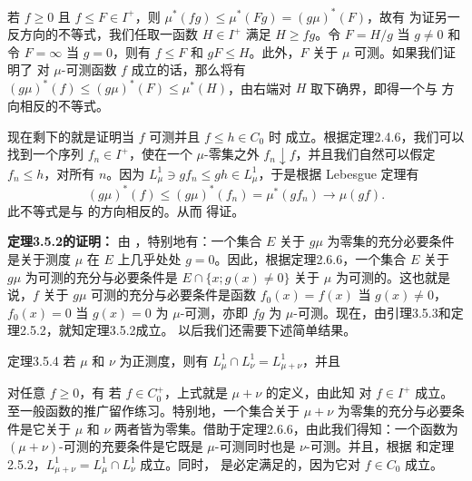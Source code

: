 若 $f\ge0$ 且 $f\le F\in I^+$，则 $\mu^*(fg)\le\mu^*(Fg)=(g\mu)^*(F)$，故有
为证另一反方向的不等式，我们任取一函数 $H\in I^+$ 满足 $H\ge fg$。令 $F=H/g$ 当 $g\ne0$ 和令 $F=\infty$ 当 $g=0$，则有 $f\le F$ 和 $gF\le H$。此外，$F$ 关于 $\mu$ 可测。如果我们证明了  对 $\mu$-可测函数 $f$ 成立的话，那么将有 $(g\mu)^*(f)\le(g\mu)^*(F)\le\mu^*(H)$，由右端对 $H$ 取下确界，即得一个与  方向相反的不等式。

现在剩下的就是证明当 $f$ 可测并且 $f\le h\in C_0$ 时  成立。根据定理2.4.6，我们可以找到一个序列 $f_n\in I^+$，使在一个 $\mu$-零集之外 $f_n\downarrow f$，并且我们自然可以假定 $f_n\le h$，对所有 $n$。因为 $L^1_\mu\ni gf_n\le gh\in L^1_\mu$，于是根据 Lebesgue 定理有
\[(g\mu)^*(f)\le(g\mu)^*(f_n)=\mu^*(gf_n)\longrightarrow\mu(gf).\]
此不等式是与  的方向相反的。从而  得证。

\textbf{定理3.5.2的证明：} 由 ，特别地有：一个集合 $E$ 关于 $g\mu$ 为零集的充分必要条件是关于测度 $\mu$ 在 $E$ 上几乎处处 $g=0$。因此，根据定理2.6.6，一个集合 $E$ 关于 $g\mu$ 为可测的充分与必要条件是 $E\cap\{x;g(x)\ne0\}$ 关于 $\mu$ 为可测的。这也就是说，$f$ 关于 $g\mu$ 可测的充分与必要条件是函数 $f_0(x)=f(x)$ 当 $g(x)\ne0$，$f_0(x)=0$ 当 $g(x)=0$ 为 $\mu$-可测，亦即 $fg$ 为 $\mu$-可测。现在，由引理3.5.3和定理2.5.2，就知定理3.5.2成立。
以后我们还需要下述简单结果。
\begin{statement}{定理}{3.5.4}
若 $\mu$ 和 $\nu$ 为正测度，则有 $L^1_\mu\cap L^1_\nu=L^1_{\mu+\nu}$，并且
\end{statement}
\Proof 对任意 $f\ge0$，有
若 $f\in C_0^+$，上式就是 $\mu+\nu$ 的定义，由此知  对 $f\in I^+$ 成立。至一般函数的推广留作练习。特别地，一个集合关于 $\mu+\nu$ 为零集的充分与必要条件是它关于 $\mu$ 和 $\nu$ 两者皆为零集。借助于定理2.6.6，由此我们得知：一个函数为 $(\mu+\nu)$-可测的充要条件是它既是 $\mu$-可测同时也是 $\nu$-可测。并且，根据  和定理2.5.2，$L^1_{\mu+\nu}=L^1_\mu\cap L^1_\nu$ 成立。同时， 是必定满足的，因为它对 $f\in C_0$ 成立。

